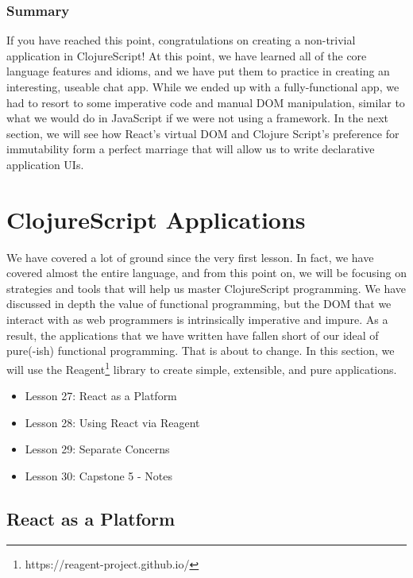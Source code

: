 \documentclass[10pt,twoside,openright]{memoir}
\begin{document}
\section{Summary}

If you have reached this point, congratulations on creating a
non-trivial application in ClojureScript! At this point, we have learned
all of the core language features and idioms, and we have put them to
practice in creating an interesting, useable chat app. While we ended up
with a fully-functional app, we had to resort to some imperative code
and manual DOM manipulation, similar to what we would do in JavaScript
if we were not using a framework. In the next section, we will see how
React's virtual DOM and Clojure Script's preference for immutability
form a perfect marriage that will allow us to write declarative
application UIs.
\cleardoublepage
{\let\newpage\relax\part{ClojureScript Applications}}

We have covered a lot of ground since the very first lesson. In fact, we
have covered almost the entire language, and from this point on, we will
be focusing on strategies and tools that will help us master
ClojureScript programming. We have discussed in depth the value of
functional programming, but the DOM that we interact with as web
programmers is intrinsically imperative and impure. As a result, the
applications that we have written have fallen short of our ideal of
pure(-ish) functional programming. That is about to change. In this
section, we will use the Reagent\footnote{https://reagent-project.github.io/} library to create
simple, extensible, and pure applications.

\begin{itemize}
\tightlist
\item Lesson 27: React as a Platform
\item Lesson 28: Using React via Reagent
\item Lesson 29: Separate Concerns
\item Lesson 30: Capstone 5 - Notes
\end{itemize}


\chapter{React as a Platform}
\end{document}
